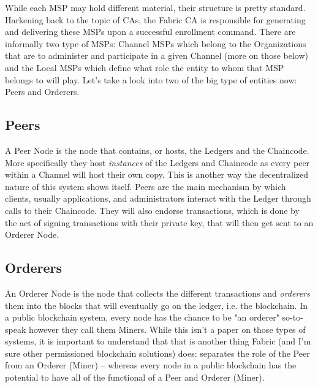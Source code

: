		
		
		\hspace{10mm}While each MSP may hold different material, their structure is pretty standard. Harkening back to the topic of CAs, the Fabric CA is responsible for generating and delivering these MSPs upon a successful enrollment command. There are informally two type of MSPs: Channel MSPs which belong to the Organizations that are to administer and participate in a given Channel (more on those below) and the Local MSPs which define what role the entity to whom that MSP belongs to will play. Let's take a look into two of the big type of entities now: Peers and Orderers.\\
		
	\subsection{Peers}
		\hspace{10mm}A Peer Node is the node that contains, or hosts, the Ledgers and the Chaincode. More specifically they host \textit{instances} of the Ledgers and Chaincode as every peer within a Channel will host their own copy. This is another way the decentralized nature of this system shows itself. Peers are the main mechanism by which clients, usually applications, and administrators interact with the Ledger through calls to their Chaincode. They will also endorse transactions, which is done by the act of signing transactions with their private key, that will then get sent to an Orderer Node.\\	
		
	\subsection{Orderers}
		\hspace{10mm}An Orderer Node is the node that collects the different transactions and \textit{orderers} them into the blocks that will eventually go on the ledger, i.e. the blockchain. In a public blockchain system, every node has the chance to be "an orderer" so-to-speak however they call them Miners. While this isn't a paper on those types of systems, it is important to understand that that is another thing Fabric (and I'm sure other permissioned blockchain solutions) does: separates the role of the Peer from an Orderer (Miner) -- whereas every node in a public blockchain has the potential to have all of the functional of a Peer and Orderer (Miner).\\
		
